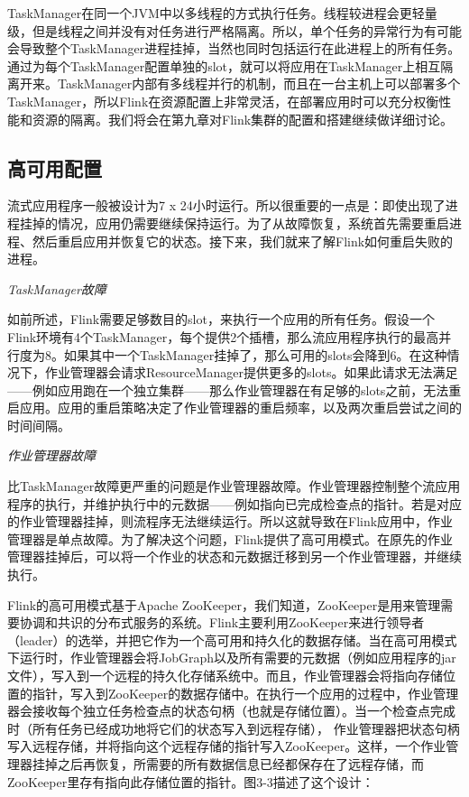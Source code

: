\documentclass[cn,11pt,chinese]{elegantbook}
\begin{document}
TaskManager在同一个JVM中以多线程的方式执行任务。线程较进程会更轻量级，但是线程之间并没有对任务进行严格隔离。所以，单个任务的异常行为有可能会导致整个TaskManager进程挂掉，当然也同时包括运行在此进程上的所有任务。通过为每个TaskManager配置单独的slot，就可以将应用在TaskManager上相互隔离开来。TaskManager内部有多线程并行的机制，而且在一台主机上可以部署多个TaskManager，所以Flink在资源配置上非常灵活，在部署应用时可以充分权衡性能和资源的隔离。我们将会在第九章对Flink集群的配置和搭建继续做详细讨论。

\hypertarget{ux9ad8ux53efux7528ux914dux7f6e}{%
\subsection{高可用配置}\label{ux9ad8ux53efux7528ux914dux7f6e}}

流式应用程序一般被设计为7 x
24小时运行。所以很重要的一点是：即使出现了进程挂掉的情况，应用仍需要继续保持运行。为了从故障恢复，系统首先需要重启进程、然后重启应用并恢复它的状态。接下来，我们就来了解Flink如何重启失败的进程。

\emph{TaskManager故障}

如前所述，Flink需要足够数目的slot，来执行一个应用的所有任务。假设一个Flink环境有4个TaskManager，每个提供2个插槽，那么流应用程序执行的最高并行度为8。如果其中一个TaskManager挂掉了，那么可用的slots会降到6。在这种情况下，作业管理器会请求ResourceManager提供更多的slots。如果此请求无法满足------例如应用跑在一个独立集群------那么作业管理器在有足够的slots之前，无法重启应用。应用的重启策略决定了作业管理器的重启频率，以及两次重启尝试之间的时间间隔。

\emph{作业管理器故障}

比TaskManager故障更严重的问题是作业管理器故障。作业管理器控制整个流应用程序的执行，并维护执行中的元数据------例如指向已完成检查点的指针。若是对应的作业管理器挂掉，则流程序无法继续运行。所以这就导致在Flink应用中，作业管理器是单点故障。为了解决这个问题，Flink提供了高可用模式。在原先的作业管理器挂掉后，可以将一个作业的状态和元数据迁移到另一个作业管理器，并继续执行。

Flink的高可用模式基于Apache
ZooKeeper，我们知道，ZooKeeper是用来管理需要协调和共识的分布式服务的系统。Flink主要利用ZooKeeper来进行领导者（leader）的选举，并把它作为一个高可用和持久化的数据存储。当在高可用模式下运行时，作业管理器会将JobGraph以及所有需要的元数据（例如应用程序的jar文件），写入到一个远程的持久化存储系统中。而且，作业管理器会将指向存储位置的指针，写入到ZooKeeper的数据存储中。在执行一个应用的过程中，作业管理器会接收每个独立任务检查点的状态句柄（也就是存储位置）。当一个检查点完成时（所有任务已经成功地将它们的状态写入到远程存储），
作业管理器把状态句柄写入远程存储，并将指向这个远程存储的指针写入ZooKeeper。这样，一个作业管理器挂掉之后再恢复，所需要的所有数据信息已经都保存在了远程存储，而ZooKeeper里存有指向此存储位置的指针。图3-3描述了这个设计：
\end{document}
